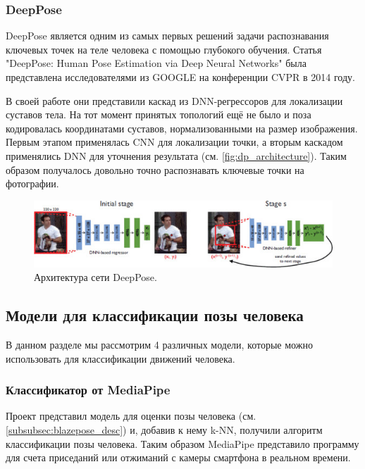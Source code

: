 \subsubsection{DeepPose}
\label{subsubsec:deeppose_desc}

DeepPose является одним из самых первых решений задачи распознавания ключевых точек на теле человека с помощью глубокого обучения. Статья "DeepPose: Human Pose Estimation via Deep Neural Networks"{} \cite{DeepPose} была представлена исследователями из GOOGLE на конференции CVPR в 2014 году.

В своей работе они представили каскад из DNN-регрессоров для локализации суставов тела. На тот момент принятых топологий ещё не было и поза кодировалась координатами суставов, нормализованными на размер изображения.
Первым этапом применялась CNN для локализации точки, а вторым каскадом применялись DNN для уточнения результата (см. \autoref{fig:dp_architecture}). Таким образом получалось довольно точно распознавать ключевые точки на фотографии.

\begin{figure}[h]
	\centering
	\includegraphics[width=\textwidth]{./images/DeepPose}
	\caption{Архитектура сети DeepPose. \cite{DeepPose}}
	\label{fig:dp_architecture}
\end{figure}
\hfill \break






\subsection{Модели для классификации позы человека}
\label{subsec:pose_classification_models}

В данном разделе мы рассмотрим 4 различных модели, которые можно использовать для классификации движений человека.



\subsubsection{Классификатор от MediaPipe}
\label{subsubsec:mp_classificator_desc}

Проект представил модель для оценки позы человека (см. \autoref{subsubsec:blazepose_desc}) и, добавив к нему k-NN, получили алгоритм классификации позы человека. Таким образом MediaPipe представило программу для счета приседаний или отжиманий с камеры смартфона в реальном времени. \cite{mediapipe_cls}

